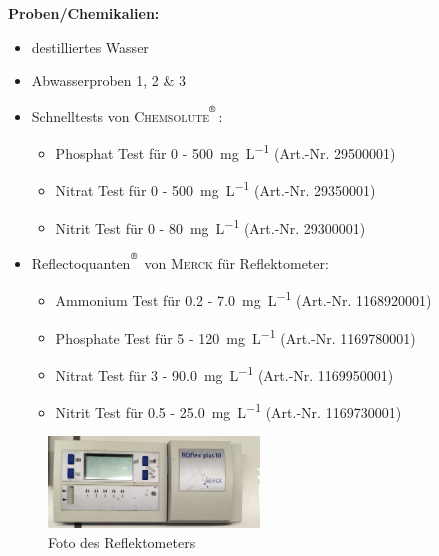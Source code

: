 \textbf{Proben/Chemikalien:}
\begin{itemize}
	\item destilliertes Wasser
	\item Abwasserproben 1, 2 \& 3
		\item Schnelltests von \textsc{Chemsolute$^{\textsuperscript{\textregistered}}$}:
	\begin{itemize}
		\item Phosphat Test für \SI{0}{} - \SI{500}{\milli \gram \per \liter}  (Art.-Nr. 29500001) 
		\item Nitrat Test für \SI{0}{} - \SI{500}{\milli \gram \per \liter}  (Art.-Nr. 29350001) 
		\item Nitrit Test für \SI{0}{} - \SI{80}{\milli \gram \per \liter}  (Art.-Nr. 29300001) 
	\end{itemize}
	\item Reflectoquanten$^{\textsuperscript{\textregistered}}$ von \textsc{Merck} für Reflektometer:
	\begin{itemize}
		\item Ammonium Test für \SI{0.2}{} - \SI{7.0}{\milli \gram \per \liter}  (Art.-Nr. 1168920001) 
		\item Phosphate Test für \SI{5}{} - \SI{120}{\milli \gram \per \liter}  (Art.-Nr. 1169780001) 
		\item Nitrat Test für \SI{3}{} - \SI{90.0}{\milli \gram \per \liter}  (Art.-Nr. 1169950001) 
		\item Nitrit Test für \SI{0.5}{} - \SI{25.0}{\milli \gram \per \liter}  (Art.-Nr. 1169730001) 
	\end{itemize}
\end{itemize}
\begin{figure}[h!]
	\centering
	\includegraphics[width=0.5\textwidth]{img/reflektometer}
	\caption{Foto des Reflektometers}
	\label{fig:reflektometer}
\end{figure}
\FloatBarrier





